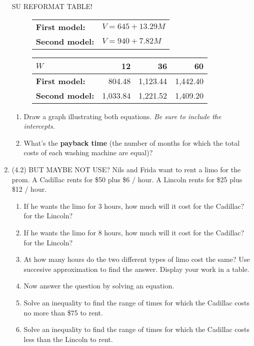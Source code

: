 \documentclass[12pt]{article}
\begin{document}
\begin{enumerate}
SU REFORMAT TABLE!
 \begin{figure} [h]  
\begin{minipage}{2.5in} 
\begin{center}
\begin{tabular} {ll} \\
\textbf{First model:} &$V = 645 + 13.29M$ \\ 
\textbf{Second model:}  & $V = 940 + 7.82M$ \\ 
\end{tabular}
\end{center}
\end{minipage} 
\begin{minipage}{4 in} 
\begin{center}
\begin{tabular} {|l|r|r|r|} \hline
$W$ & 12 & 36 & 60 \\ \hline
\textbf{First model:} & 804.48  & 1,123.44 &  1,442.40  \\ \hline
\textbf{Second model:} &  1,033.84 &  1,221.52 &  1,409.20 \\ \hline
\end{tabular}
\end{center}
\end{minipage} 
\end{figure} 
\vspace{-.1in}
\begin{enumerate}
\item Draw a graph illustrating both equations. \emph{Be sure to include the intercepts.}
\item What's the  \textbf{payback time} (the number of months for which the total costs of each washing machine are equal)?
\end{enumerate}


\item (4.2)  BUT MAYBE NOT USE?  Nils and Frida want to rent a limo for the prom.  A Cadillac rents for \$50 plus \$6 / hour. A  Lincoln rents for \$25 plus \$12 / hour.
\begin{enumerate}
\item If he wants the limo for 3 hours, how much will it cost for the Cadillac?  for the Lincoln?
\item If he wants the limo for 8 hours, how much will it cost for the Cadillac?  for the Lincoln?
\item At how many hours do the two different types of limo cost the same? Use succesive approximation to find the answer.  Display your work in a table.
\item Now answer the question by solving an equation.
\item Solve an inequality to find the range of times for which the Cadillac costs no more than \$75 to rent.
\item Solve an inequality to find the range of times for which the Cadillac costs less than the Lincoln to rent.
\end{enumerate}


\end{enumerate}
\end{document}
